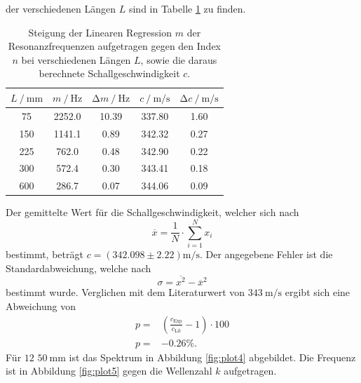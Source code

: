 der verschiedenen Längen $L$ sind in Tabelle \ref{tab:tab1} zu finden.
\begin{table}
  \centering
  \caption{Steigung der Linearen Regression $m$ der Resonanzfrequenzen aufgetragen gegen
  den Index $n$ bei verschiedenen Längen $L$, sowie die daraus berechnete Schallgeschwindigkeit $c$.}
  \label{tab:tab1}
  \begin{tabular}{c|c|c|c|c}
    $L \:/\: \si{\milli\meter}$ & $m \:/\: \si{\hertz}$ & $\increment m \:/\: \si{\hertz}$ & $c \:/\: \si{\meter\per\second}$ & $\increment c \:/\: \si{\meter\per\second}$ \\
    \midrule
    75 & 2252.0 & 10.39 & 337.80 & 1.60 \\
    150 & 1141.1 & 0.89 & 342.32 & 0.27 \\
    225 & 762.0 & 0.48 & 342.90 & 0.22 \\
    300 & 572.4 & 0.30 & 343.41 & 0.18 \\
    600 & 286.7 & 0.07 & 344.06 & 0.09
  \end{tabular}
\end{table}
Der gemittelte Wert für die Schallgeschwindigkeit, welcher sich nach
\begin{equation}
  \overline{x}=\frac{1}{N}\cdot\sum_{i=1}^{N}x_i
\end{equation}
bestimmt, beträgt $c=(342.098\pm 2.22)\si{\meter\per\second}$. Der angegebene Fehler ist
die Standardabweichung, welche nach
\begin{equation}
  \sigma = \overline{x^2}-\overline{x}^2
\end{equation}
bestimmt wurde. Verglichen mit dem Literaturwert von $\SI{343}{\meter\per\second}$
ergibt sich eine Abweichung von  %
\begin{align}
  p =& (\frac{c_{\text{Exp}}}{c_{\text{Lit}}}-1)\cdot100\\
  p =& -0.26\%.
\end{align}
Für $12$ $\SI{50}{\milli\meter}$ ist das Spektrum in Abbildung \ref{fig:plot4} abgebildet. Die Frequenz
ist in Abbildung \ref{fig:plot5} gegen die Wellenzahl $k$ aufgetragen.
